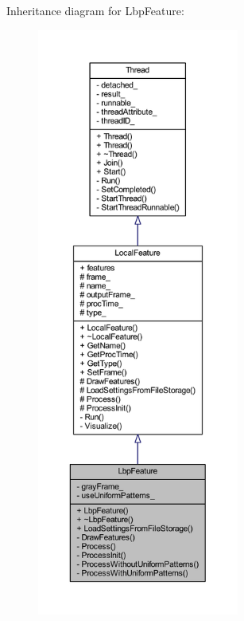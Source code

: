 Inheritance diagram for Lbp\-Feature\-:
\nopagebreak
\begin{figure}[H]
\begin{center}
\leavevmode
\includegraphics[height=550pt]{class_lbp_feature__inherit__graph}
\end{center}
\end{figure}



